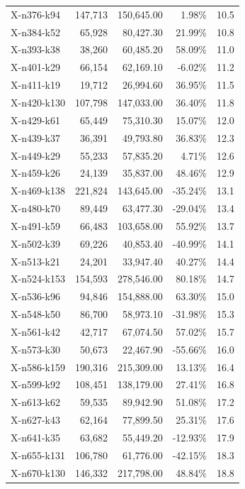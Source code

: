 \documentclass[12pt,a4paper]{article}
\begin{document}
\begin{longtable}{@{}lrrrr@{}}
    X-n376-k94 & 147,713 & 150,645.00 & 1.98\% & 10.5 \\
    X-n384-k52 & 65,928 & 80,427.30 & 21.99\% & 10.8 \\
    X-n393-k38 & 38,260 & 60,485.20 & 58.09\% & 11.0 \\
    X-n401-k29 & 66,154 & 62,169.10 & -6.02\% & 11.2 \\
    X-n411-k19 & 19,712 & 26,994.60 & 36.95\% & 11.5 \\
    X-n420-k130 & 107,798 & 147,033.00 & 36.40\% & 11.8 \\
    X-n429-k61 & 65,449 & 75,310.30 & 15.07\% & 12.0 \\
    X-n439-k37 & 36,391 & 49,793.80 & 36.83\% & 12.3 \\
    X-n449-k29 & 55,233 & 57,835.20 & 4.71\% & 12.6 \\
    X-n459-k26 & 24,139 & 35,837.00 & 48.46\% & 12.9 \\
    X-n469-k138 & 221,824 & 143,645.00 & -35.24\% & 13.1 \\
    X-n480-k70 & 89,449 & 63,477.30 & -29.04\% & 13.4 \\
    X-n491-k59 & 66,483 & 103,658.00 & 55.92\% & 13.7 \\
    X-n502-k39 & 69,226 & 40,853.40 & -40.99\% & 14.1 \\
    X-n513-k21 & 24,201 & 33,947.40 & 40.27\% & 14.4 \\
    X-n524-k153 & 154,593 & 278,546.00 & 80.18\% & 14.7 \\
    X-n536-k96 & 94,846 & 154,888.00 & 63.30\% & 15.0 \\
    X-n548-k50 & 86,700 & 58,973.10 & -31.98\% & 15.3 \\
    X-n561-k42 & 42,717 & 67,074.50 & 57.02\% & 15.7 \\
    X-n573-k30 & 50,673 & 22,467.90 & -55.66\% & 16.0 \\
    X-n586-k159 & 190,316 & 215,309.00 & 13.13\% & 16.4 \\
    X-n599-k92 & 108,451 & 138,179.00 & 27.41\% & 16.8 \\
    X-n613-k62 & 59,535 & 89,942.90 & 51.08\% & 17.2 \\
    X-n627-k43 & 62,164 & 77,899.50 & 25.31\% & 17.6 \\
    X-n641-k35 & 63,682 & 55,449.20 & -12.93\% & 17.9 \\
    X-n655-k131 & 106,780 & 61,776.00 & -42.15\% & 18.3 \\
    X-n670-k130 & 146,332 & 217,798.00 & 48.84\% & 18.8 \\

\end{longtable}
\end{document}

